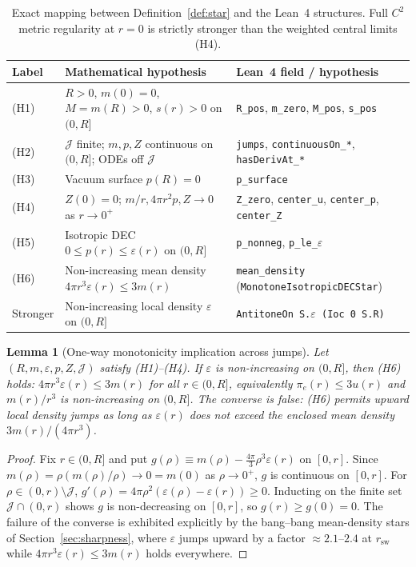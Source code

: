\documentclass[11pt]{article}
\theoremstyle{plain}
\newtheorem{lemma}[theorem]{Lemma}
\theoremstyle{definition}
\newcommand{\eps}{\varepsilon}
\begin{document}
\begin{table}[ht]
\centering
\small
\begin{tabular}{@{}p{}p{}p{}@{}}
\toprule
Label & Mathematical hypothesis & Lean~4 field / hypothesis \\
\midrule
(H1) & $R > 0$, $m(0)=0$, $M=m(R)>0$, $s(r) > 0$ on $(0, R]$ & \texttt{R\_pos}, \texttt{m\_zero}, \texttt{M\_pos}, \texttt{s\_pos} \\
(H2) & $\mathcal{J}$ finite; $m,p,Z$ continuous on $(0,R]$; ODEs off $\mathcal{J}$ & \texttt{jumps}, \texttt{continuousOn\_*}, \texttt{hasDerivAt\_*} \\
(H3) & Vacuum surface $p(R) = 0$ & \texttt{p\_surface} \\
(H4) & $Z(0)=0$; $m/r, 4\pi r^2 p, Z \to 0$ as $r \to 0^+$ & \texttt{Z\_zero}, \texttt{center\_u}, \texttt{center\_p}, \texttt{center\_Z} \\
(H5) & Isotropic DEC $0 \le p(r) \le \eps(r)$ on $(0, R]$ & \texttt{p\_nonneg}, \texttt{p\_le\_$\eps$} \\
(H6) & Non-increasing mean density $4\pi r^3 \eps(r) \le 3 m(r)$ & \texttt{mean\_density} (\texttt{MonotoneIsotropicDECStar}) \\
Stronger & Non-increasing local density $\eps$ on $(0, R]$ & \texttt{AntitoneOn S.$\eps$ (Ioc 0 S.R)} \\
\bottomrule
\end{tabular}
\caption{Exact mapping between Definition~\ref{def:star} and the Lean~4 structures. Full $C^2$ metric regularity at $r=0$ is strictly stronger than the weighted central limits (H4).}
\label{tab:bridge}
\end{table}

\begin{lemma}[One-way monotonicity implication across jumps]
\label{lem:mean-density}
Let $(R, m, \eps, p, Z, \mathcal{J})$ satisfy (H1)--(H4). If $\eps$ is non-increasing on $(0, R]$, then (H6) holds: $4\pi r^3 \eps(r) \le 3 m(r)$ for all $r \in (0, R]$, equivalently $\pi_e(r) \le 3 u(r)$ and $m(r)/r^3$ is non-increasing on $(0, R]$. The converse is false: (H6) permits upward local density jumps as long as $\eps(r)$ does not exceed the enclosed mean density $3 m(r)/(4\pi r^3)$.
\end{lemma}

\begin{proof}
Fix $r \in (0, R]$ and put $g(\rho) \equiv m(\rho) - \frac{4\pi}{3}\rho^3 \eps(r)$ on $[0, r]$. Since $m(\rho) = \rho (m(\rho)/\rho) \to 0 = m(0)$ as $\rho \to 0^+$, $g$ is continuous on $[0, r]$. For $\rho \in (0, r) \setminus \mathcal{J}$, $g'(\rho) = 4\pi \rho^2 (\eps(\rho) - \eps(r)) \ge 0$. Inducting on the finite set $\mathcal{J} \cap (0, r)$ shows $g$ is non-decreasing on $[0, r]$, so $g(r) \ge g(0) = 0$. The failure of the converse is exhibited explicitly by the bang--bang mean-density stars of Section~\ref{sec:sharpness}, where $\eps$ jumps upward by a factor $\approx 2.1$--$2.4$ at $r_{\mathrm{sw}}$ while $4\pi r^3 \eps(r) \le 3 m(r)$ holds everywhere.
\end{proof}
\end{document}
